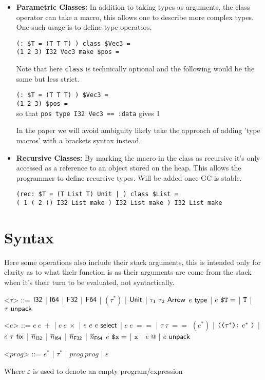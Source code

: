 \documentclass{article}
\begin{document}
\begin{itemize}
\begin{itemize}
        \item \textbf{Parametric Classes:} In addition to taking types as arguments, the class operator can take a macro, this allows one to describe more complex types. One such usage is to define type operators.

        \texttt{(: \$T = (T T T) ) class \$Vec3 =}\\
        \texttt{(1 2 3) I32 Vec3 make \$pos =}

        Note that here \texttt{class} is technically optional and the following would be the same but less strict.

        \texttt{(: \$T = (T T T) ) \$Vec3 =}\\
        \texttt{(1 2 3) \$pos =}\\
        so that \texttt{pos type I32 Vec3 == :data} gives 1

        In the paper we will avoid ambiguity likely take the approach of adding 'type macros' with a brackets syntax instead.

        \item \textbf{Recursive Classes:} By marking the macro in the class as recursive it's only accessed as a reference to an object stored on the heap. This allows the programmer to define recursive types. Will be added once GC is stable.

        \texttt{(rec: \$T = (T List T) Unit | ) class \$List =}\\
        \texttt{( 1 ( 2 () I32 List make ) I32 List make ) I32 List make}
    \end{itemize}
\end{itemize}

\section{Syntax}
Here some operations also include their stack arguments, this is intended only for clarity as to what their function is as their arguments are come from the stack when it's their turn to be evaluated, not syntactically.

\renewcommand{\grammarlabel}[2]{#1 \hfill#2}
\begin{grammar}
    <$\tau$> ::= $\mathsf{I32}$
    |    $\mathsf{I64}$
    |    $\mathsf{F32}$
    |    $\mathsf{F64}$
    |    $(\tau^*)$
    |    $\mathsf{Unit}$
    |    $\tau_1 ~ \tau_2 ~ \mathsf{Arrow}$
    \alt $e ~ \mathsf{type}$
    |    $e~ \texttt{\$T} =$
    |    $\texttt{T}$
    |    $\tau ~ \mathsf{unpack}$

    <$e$> ::= $e~ e~ +$
    |    $e~ e~ \times$
    |    $e ~ e ~ e ~ \mathsf{select} $
    |    $e~ e~ ==$
    |    $\tau~ \tau~ ==$
    \alt $(e^*)$
    |    $\texttt{((} \tau^* \texttt{):} ~ e^* ~ \texttt{)}$
    |    $e ~ \tau ~ \mathsf{fix}$
    |    $\overline{n}_{\mathsf{I32}}$
    |    $\overline{n}_{\mathsf{I64}}$
    |    $\overline{n}_{\mathsf{F32}}$
    |    $\overline{n}_{\mathsf{F64}}$
    \alt $e~ \texttt{\$x} =$
    |    $\texttt{x}$
    |    $e~ \textbf{@} $
    |    $e ~ \mathsf{unpack}$
    
    <$prog$> ::= $e^*$ | $\tau^*$ | $prog~ prog$ | $\varepsilon$
\end{grammar}
Where $\varepsilon$ is used to denote an empty program/expression
\end{document}
